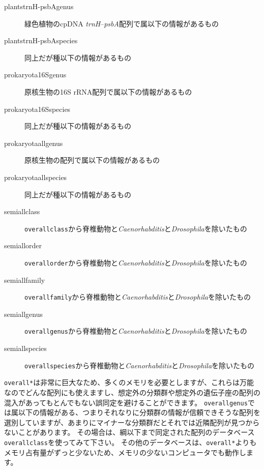 \documentclass[titlepage,10pt,a4paper]{jsbook}
\begin{document}
\begin{description}
\item[plants{\textunderscore}trnH-psbA{\textunderscore}genus] 緑色植物のcpDNA \textit{trnH}--\textit{psbA}配列で属以下の情報があるもの
\item[plants{\textunderscore}trnH-psbA{\textunderscore}species] 同上だが種以下の情報があるもの
\item[prokaryota{\textunderscore}16S{\textunderscore}genus] 原核生物の16S rRNA配列で属以下の情報があるもの
\item[prokaryota{\textunderscore}16S{\textunderscore}species] 同上だが種以下の情報があるもの
\item[prokaryota{\textunderscore}all{\textunderscore}genus] 原核生物の配列で属以下の情報があるもの
\item[prokaryota{\textunderscore}all{\textunderscore}species] 同上だが種以下の情報があるもの
\item[semiall{\textunderscore}class] \texttt{overall{\textunderscore}class}から脊椎動物と\textit{Caenorhabditis}と\textit{Drosophila}を除いたもの
\item[semiall{\textunderscore}order] \texttt{overall{\textunderscore}order}から脊椎動物と\textit{Caenorhabditis}と\textit{Drosophila}を除いたもの
\item[semiall{\textunderscore}family] \texttt{overall{\textunderscore}family}から脊椎動物と\textit{Caenorhabditis}と\textit{Drosophila}を除いたもの
\item[semiall{\textunderscore}genus] \texttt{overall{\textunderscore}genus}から脊椎動物と\textit{Caenorhabditis}と\textit{Drosophila}を除いたもの
\item[semiall{\textunderscore}species] \texttt{overall{\textunderscore}species}から脊椎動物と\textit{Caenorhabditis}と\textit{Drosophila}を除いたもの
\end{description}

\texttt{overall{\textunderscore}*}は非常に巨大なため、多くのメモリを必要としますが、これらは万能なのでどんな配列にも使えますし、想定外の分類群や想定外の遺伝子座の配列の混入があってもとんでもない誤同定を避けることができます。
\texttt{overall{\textunderscore}genus}では属以下の情報がある、つまりそれなりに分類群の情報が信頼できそうな配列を選別していますが、あまりにマイナーな分類群だとそれでは近隣配列が見つからないことがあります。
その場合は、綱以下まで同定された配列のデータベース\texttt{overall{\textunderscore}class}を使ってみて下さい。
その他のデータベースは、\texttt{overall{\textunderscore}*}よりもメモリ占有量がずっと少ないため、メモリの少ないコンピュータでも動作します。
\end{document}
